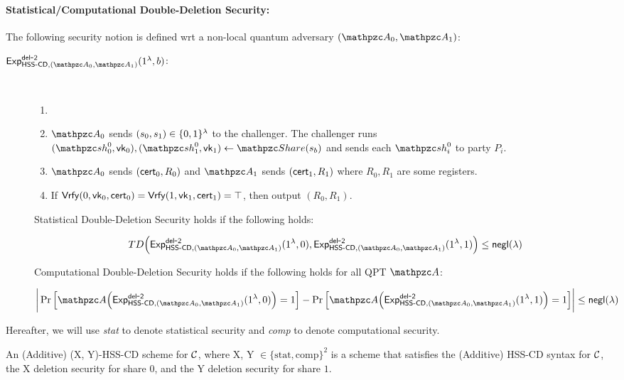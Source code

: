 \paragraph{Statistical/Computational Double-Deletion Security:}

The following security notion is defined wrt a non-local quantum
adversary $(\qA_0, \qA_1)$:

\begin{description}
\item [$\expb{\HSScd, (\qA_0, \qA_1)}{del}{2}(1^\secp, b)$:] $ $
\begin{enumerate}
\item 
\item $\qA_0$ sends $(s_0, s_1) \in \{0,1\}^\lambda$ to the challenger.
The challenger runs
$(\qsh_0^0, \vk_0), (\qsh_1^0, \vk_1) \gets \Sh(s_b)$ and sends each
$\qsh_i^0$ to party $P_i$.

\item $\qA_0$ sends $(\mathsf{cert}_0, R_0)$ and $\qA_{1}$ sends
$(\mathsf{cert}_{1}, R_{1})$ where $R_0, R_1$ are some registers.
\item If $\mathsf{Vrfy}(0, \mathsf{vk}_0, \mathsf{cert}_0) = \mathsf{Vrfy}(1, \mathsf{vk}_1, \mathsf{cert}_1)=
\top$, then output $(R_0, R_1)$.
\end{enumerate}

Statistical Double-Deletion Security holds if the following holds:

$$TD\Big(\expb{\HSScd, (\qA_0, \qA_1)}{del}{2}(1^\secp, 
0), \expb{\HSScd, (\qA_0, \qA_1)}{del}{2}(1^\secp,
1)\Big) \le \negl(\secp)$$

Computational Double-Deletion Security holds if the following holds
for all QPT $\qA$:

$$\bigg\lvert \Pr\Big[\qA\Big(\expb{\HSScd, (\qA_0,
\qA_1)}{del}{2}(1^\secp, 0)\Big)=1\Big] -
\Pr\Big[\qA\Big(\expb{\HSScd, (\qA_0,
\qA_1)}{del}{2}(1^\secp, 1)\Big)=1\Big]
\bigg\rvert \le \negl(\secp)$$

\end{description}

Hereafter, we will use \emph{stat} to denote statistical
security and \emph{comp} to denote computational security.

\begin{definition}
An (Additive) (X, Y)-HSS-CD scheme for $\mathcal{C}$, where X, Y $\in
\{\textrm{stat},
\textrm{comp}\}^2$  is a scheme that satisfies the (Additive) HSS-CD
syntax for $\mathcal{C}$, the X deletion security for share $0$, and the
Y deletion security for share $1$.
\end{definition}

